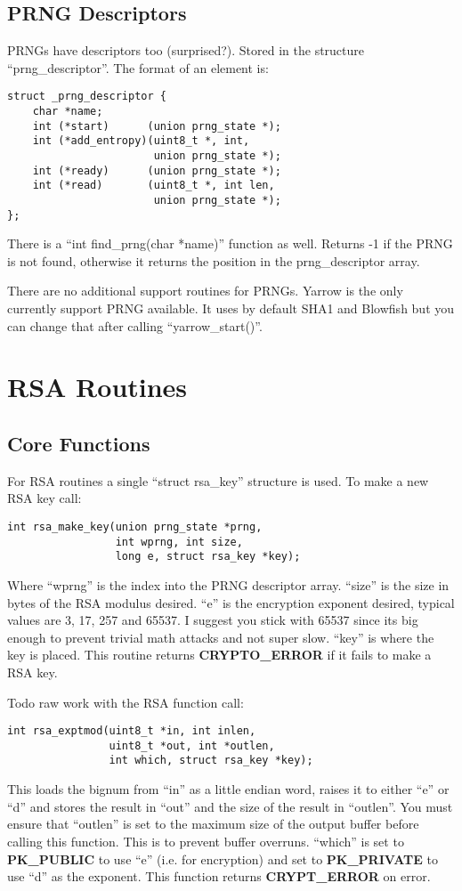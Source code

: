 \documentclass{book}
\begin{document}
\section{PRNG Descriptors}

PRNGs have descriptors too (surprised?). Stored in the structure ``prng\_descriptor''.  The format of an element is:
\begin{verbatim}
struct _prng_descriptor {
    char *name;
    int (*start)      (union prng_state *);
    int (*add_entropy)(uint8_t *, int, 
                       union prng_state *);
    int (*ready)      (union prng_state *);
    int (*read)       (uint8_t *, int len, 
                       union prng_state *);
};
\end{verbatim}

There is a ``int find\_prng(char *name)'' function as well.  Returns -1 if the PRNG is not found, otherwise it returns
the position in the prng\_descriptor array.

There are no additional support routines for PRNGs.  Yarrow is the only currently support PRNG available.  It uses by 
default SHA1 and Blowfish but you can change that after calling ``yarrow\_start()''.

\chapter{RSA Routines}
\section{Core Functions}

For RSA routines a single ``struct rsa\_key'' structure is used.  To make a new RSA key call:
\begin{verbatim}
int rsa_make_key(union prng_state *prng, 
                 int wprng, int size, 
                 long e, struct rsa_key *key);
\end{verbatim}

Where ``wprng'' is the index into the PRNG descriptor array.  ``size'' is the size in bytes of the RSA modulus desired.
``e'' is the encryption exponent desired, typical values are 3, 17, 257 and 65537.  I suggest you stick with 65537 since its big
enough to prevent trivial math attacks and not super slow.  ``key'' is where the key is placed.  This routine returns
{\bf CRYPTO\_ERROR} if it fails to make a RSA key.

Todo raw work with the RSA function call:
\begin{verbatim}
int rsa_exptmod(uint8_t *in, int inlen, 
                uint8_t *out, int *outlen, 
                int which, struct rsa_key *key);
\end{verbatim}
This loads the bignum from ``in'' as a little endian word, raises it to either ``e'' or ``d'' and stores the result
in ``out'' and the size of the result in ``outlen''.  You must ensure that ``outlen'' is set to the maximum size of
the output buffer before calling this function.  This is to prevent buffer overruns.  ``which'' is set to 
{\bf PK\_PUBLIC} to use ``e'' (i.e. for encryption) and set to {\bf PK\_PRIVATE} to use ``d'' as the exponent.  This
function returns {\bf CRYPT\_ERROR} on error.
\end{document}
